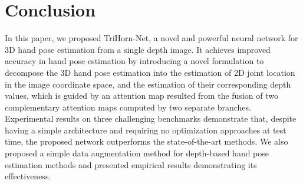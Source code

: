 \documentclass{article}
\begin{document}
\section{Conclusion}
In this paper, we proposed TriHorn-Net, a novel and powerful neural network for 3D hand pose estimation from a single depth image. It achieves improved accuracy in hand pose estimation by introducing a novel formulation to decompose the 3D hand pose estimation into the estimation of 2D joint location in the image coordinate space, and the estimation of their corresponding depth values, which is guided by an attention map resulted from the fusion of two complementary attention maps computed by two separate branches. Experimental results on three challenging benchmarks demonstrate that, despite having a simple architecture and requiring no optimization approaches at test time, the proposed network outperforms the state-of-the-art methods. We also proposed a simple data augmentation method for depth-based hand pose estimation methods and presented empirical results demonstrating its effectiveness.
\end{document}
